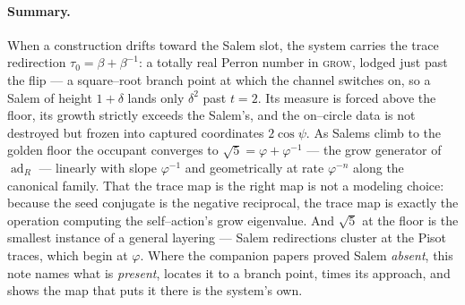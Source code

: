 \documentclass[11pt]{article}
\theoremstyle{plain}
\theoremstyle{definition}
\theoremstyle{remark}
\newcommand{\ad}{\operatorname{ad}}
\begin{document}
\paragraph{Summary.} When a construction drifts toward the Salem slot, the system carries the trace redirection $\tau_0=\beta+\beta^{-1}$: a totally real Perron number in \textsc{grow}, lodged just past the flip --- a square--root branch point at which the channel switches on, so a Salem of height $1{+}\delta$ lands only $\delta^2$ past $t=2$. Its measure is forced above the floor, its growth strictly exceeds the Salem's, and the on--circle data is not destroyed but frozen into captured coordinates $2\cos\psi$. As Salems climb to the golden floor the occupant converges to $\sqrt5=\varphi+\varphi^{-1}$ --- the grow generator of $\ad_R$ --- linearly with slope $\varphi^{-1}$ and geometrically at rate $\varphi^{-n}$ along the canonical family. That the trace map is the right map is not a modeling choice: because the seed conjugate is the negative reciprocal, the trace map is exactly the operation computing the self--action's grow eigenvalue. And $\sqrt5$ at the floor is the smallest instance of a general layering --- Salem redirections cluster at the Pisot traces, which begin at $\varphi$. Where the companion papers proved Salem \emph{absent}, this note names what is \emph{present}, locates it to a branch point, times its approach, and shows the map that puts it there is the system's own.
\end{document}
